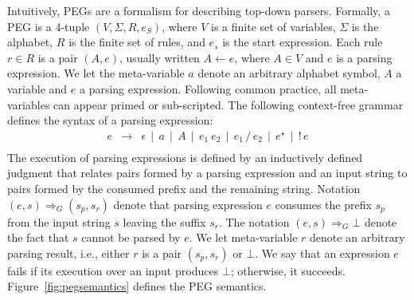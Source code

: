 \documentclass[preprint,12pt]{elsarticle}
\theoremstyle{definition}
\begin{document}
Intuitively, PEGs are a formalism for describing top-down parsers.
Formally, a PEG is a 4-tuple $(V,\Sigma,R,e_S)$, where $V$ is a
finite set of variables, $\Sigma$ is the alphabet, $R$ is the finite
set of rules, and $e_s$ is the start expression. Each rule $r \in R$ is a
pair $(A,e)$, usually written $A \leftarrow e$, where $A \in V$ and $e$
is a parsing expression. We let the meta-variable $a$ denote an
arbitrary alphabet symbol, $A$ a variable and $e$ a parsing expression.
Following common practice, all meta-variables can appear primed or
sub-scripted. The following context-free grammar defines
the syntax of a parsing expression:
\[
\begin{array}{lcl}
e & \to  & \epsilon \,\mid\, a \,\mid\, A\,\mid\,e_1\:e_2\,
\mid\,e_1\,/\,e_2\,\mid\,e^\star\,\mid\,!\,e\\
\end{array}
\]
The execution of parsing expressions is defined by an inductively defined
judgment that relates pairs formed by a parsing expression and an input string
to pairs formed by the consumed prefix and the remaining string.
Notation $(e,s) \Rightarrow_G (s_p,s_r)$ denote that parsing expression $e$
consumes the prefix $s_p$ from the input string $s$ leaving the suffix $s_r$.
The notation $(e,s) \Rightarrow_G \bot$ denote the fact that $s$ cannot be parsed by
$e$. We let meta-variable $r$ denote an arbitrary parsing result, i.e.,
either $r$ is a pair $(s_p,s_r)$ or $\bot$. We say that an expression $e$
fails if its execution over an input produces $\bot$; otherwise, it succeeds.
Figure~\ref{fig:pegsemantics} defines the PEG semantics.
\end{document}

